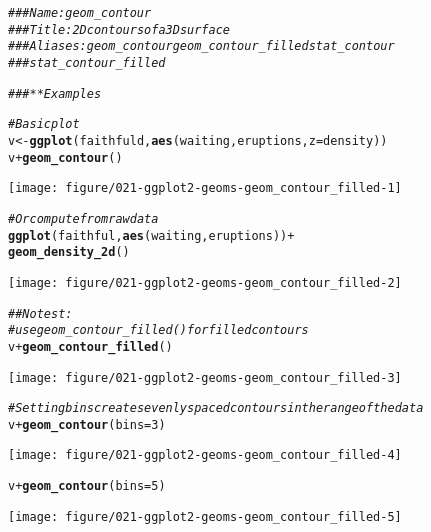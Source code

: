 \documentclass[a4paper,titlepage]{tufte-handout}\usepackage[]{graphicx}\usepackage[]{xcolor}
\makeatletter
\def\maxwidth{ %
  \ifdim\Gin@nat@width>\linewidth
    \linewidth
  \else
    \Gin@nat@width
  \fi
}
\newcommand{\hlnum}[1]{\textcolor[rgb]{0.686,0.059,0.569}{#1}}%
\newcommand{\hlcom}[1]{\textcolor[rgb]{0.678,0.584,0.686}{\textit{#1}}}%
\newcommand{\hlopt}[1]{\textcolor[rgb]{0,0,0}{#1}}%
\newcommand{\hldef}[1]{\textcolor[rgb]{0.345,0.345,0.345}{#1}}%
\newcommand{\hlkwb}[1]{\textcolor[rgb]{0.69,0.353,0.396}{#1}}%
\newcommand{\hlkwc}[1]{\textcolor[rgb]{0.333,0.667,0.333}{#1}}%
\newcommand{\hlkwd}[1]{\textcolor[rgb]{0.737,0.353,0.396}{\textbf{#1}}}%
\newenvironment{kframe}{%
 \def\at@end@of@kframe{}%
 \ifinner\ifhmode%
  \def\at@end@of@kframe{\end{minipage}}%
  \begin{minipage}{\columnwidth}%
 \fi\fi%
 \def\FrameCommand##1{\hskip\@totalleftmargin \hskip-\fboxsep
 \colorbox{shadecolor}{##1}\hskip-\fboxsep
     \hskip-\linewidth \hskip-\@totalleftmargin \hskip\columnwidth}%
 \MakeFramed {\advance\hsize-\width
   \@totalleftmargin\z@ \linewidth\hsize
   \@setminipage}}%
 {\par\unskip\endMakeFramed%
 \at@end@of@kframe}
\newenvironment{knitrout}{}{} %
\makeatother
\begin{document}
\begin{knitrout}
\color{fgcolor}\begin{kframe}
\begin{alltt}
\hlcom{### Name: geom_contour}
\hlcom{### Title: 2D contours of a 3D surface}
\hlcom{### Aliases: geom_contour geom_contour_filled stat_contour}
\hlcom{###   stat_contour_filled}

\hlcom{### ** Examples}

\hlcom{# Basic plot}
\hldef{v} \hlkwb{<-} \hlkwd{ggplot}\hldef{(faithfuld,} \hlkwd{aes}\hldef{(waiting, eruptions,} \hlkwc{z} \hldef{= density))}
\hldef{v} \hlopt{+} \hlkwd{geom_contour}\hldef{()}
\end{alltt}
\end{kframe}
\texttt{[image: figure/021-ggplot2-geoms-geom\_contour\_filled-1]} 
\begin{kframe}\begin{alltt}
\hlcom{# Or compute from raw data}
\hlkwd{ggplot}\hldef{(faithful,} \hlkwd{aes}\hldef{(waiting, eruptions))} \hlopt{+}
  \hlkwd{geom_density_2d}\hldef{()}
\end{alltt}
\end{kframe}
\texttt{[image: figure/021-ggplot2-geoms-geom\_contour\_filled-2]} 
\begin{kframe}\begin{alltt}
\hlcom{## No test: }
\hlcom{# use geom_contour_filled() for filled contours}
\hldef{v} \hlopt{+} \hlkwd{geom_contour_filled}\hldef{()}
\end{alltt}
\end{kframe}
\texttt{[image: figure/021-ggplot2-geoms-geom\_contour\_filled-3]} 
\begin{kframe}\begin{alltt}
\hlcom{# Setting bins creates evenly spaced contours in the range of the data}
\hldef{v} \hlopt{+} \hlkwd{geom_contour}\hldef{(}\hlkwc{bins} \hldef{=} \hlnum{3}\hldef{)}
\end{alltt}
\end{kframe}
\texttt{[image: figure/021-ggplot2-geoms-geom\_contour\_filled-4]} 
\begin{kframe}\begin{alltt}
\hldef{v} \hlopt{+} \hlkwd{geom_contour}\hldef{(}\hlkwc{bins} \hldef{=} \hlnum{5}\hldef{)}
\end{alltt}
\end{kframe}
\texttt{[image: figure/021-ggplot2-geoms-geom\_contour\_filled-5]} 

\end{knitrout}
\end{document}
